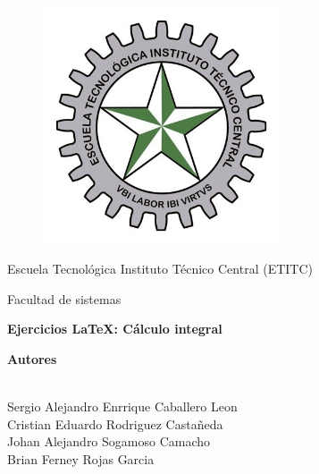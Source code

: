 \documentclass[a4paper,11pt,openany]{book}
\begin{document}
 

\begin{titlepage} 

\begin{center} 

\vspace*{-1in} 

\begin{figure}[htb] 

\begin{center} 

\includegraphics[width=7cm]{ETITC.png} 

\end{center} 

\end{figure} 

{\sc \huge Escuela Tecnológica Instituto Técnico Central (ETITC)}\\ 

\vspace*{0.15in} 

Facultad de sistemas\\ 

\vspace*{0.6in} 

\begin{Large} 

\textbf{Ejercicios {\LaTeX}: Cálculo integral} \\ 

\end{Large} 

\vspace*{0.3in} 

\begin{large} 

{\bf Autores} \\ 

\  

Sergio Alejandro Enrrique Caballero Leon\\ 
Cristian Eduardo Rodriguez Castañeda \\ 
Johan Alejandro Sogamoso Camacho \\ 
Brian Ferney Rojas Garcia


\end{large}
\end{center}
\end{titlepage}
\end{document}
